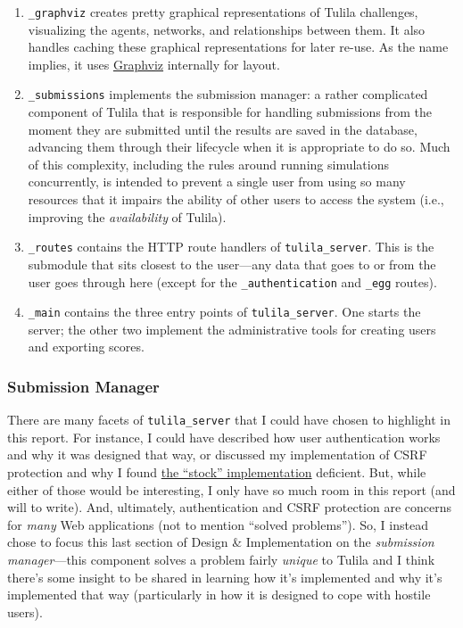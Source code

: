 \documentclass[12pt]{article}
\begin{document}
\begin{enumerate}
  \item \texttt{\_graphviz} creates pretty graphical representations of Tulila challenges, visualizing the agents, networks, and relationships between them. It also handles caching these graphical representations for later re-use. As the name implies, it uses \href{https://graphviz.org/}{Graphviz} internally for layout.
  \item \texttt{\_submissions} implements the submission manager: a rather complicated component of Tulila that is responsible for handling submissions from the moment they are submitted until the results are saved in the database, advancing them through their lifecycle when it is appropriate to do so. Much of this complexity, including the rules around running simulations concurrently, is intended to prevent a single user from using so many resources that it impairs the ability of other users to access the system (i.e., improving the \textit{availability} of Tulila).
  \item \texttt{\_routes} contains the HTTP route handlers of \texttt{tulila\_server}. This is the submodule that sits closest to the user---any data that goes to or from the user goes through here (except for the \texttt{\_authentication} and \texttt{\_egg} routes).
  \item \texttt{\_main} contains the three entry points of \texttt{tulila\_server}. One starts the server; the other two implement the administrative tools for creating users and exporting scores.
\end{enumerate}

\subsubsection{Submission Manager}


There are many facets of \texttt{tulila\_server} that I could have chosen to highlight in this report. For instance, I could have described how user authentication works and why it was designed that way, or discussed my implementation of CSRF protection and why I found \href{https://pypi.org/project/aiohttp-csrf/}{the ``stock'' implementation} deficient. But, while either of those would be interesting, I only have so much room in this report (and will to write). And, ultimately, authentication and CSRF protection are concerns for \textit{many} Web applications (not to mention ``solved problems''). So, I instead chose to focus this last section of Design \& Implementation on the \textit{submission manager}---this component solves a problem fairly \textit{unique} to Tulila and I think there's some insight to be shared in learning how it's implemented and why it's implemented that way (particularly in how it is designed to cope with hostile users).
\end{document}

